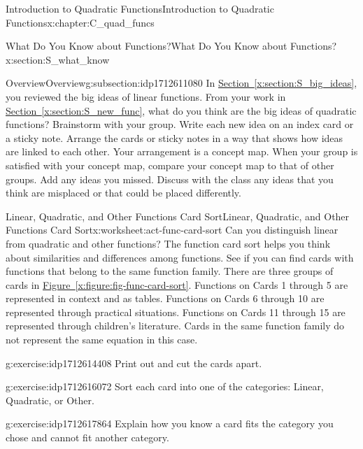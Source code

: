 \documentclass[oneside,10pt,]{book}
\newcommand{\xreffont}{\relax}
\numberwithin{equation}{chapter}
\begin{document}
\begin{chapterptx}{Introduction to Quadratic Functions}{}{Introduction to Quadratic Functions}{}{}{x:chapter:C_quad_funcs}
\begin{sectionptx}{What Do You Know about Functions?}{}{What Do You Know about Functions?}{}{}{x:section:S_what_know}
\begin{subsectionptx}{Overview}{}{Overview}{}{}{g:subsection:idp1712611080}
In \hyperref[x:section:S_big_ideas]{Section~{\xreffont\ref{x:section:S_big_ideas}}}, you reviewed the big ideas of linear functions. From your work in \hyperref[x:section:S_new_func]{Section~{\xreffont\ref{x:section:S_new_func}}\textendash{}{\xreffont\ref{x:section:S_func_fams}}}, what do you think are the big ideas of quadratic functions? Brainstorm with your group. Write each new idea on an index card or a sticky note. Arrange the cards or sticky notes in a way that shows how ideas are linked to each other. Your arrangement is a concept map. When your group is satisfied with your concept map, compare your concept map to that of other groups. Add any ideas you missed. Discuss with the class any ideas that you think are misplaced or that could be placed differently.%
\end{subsectionptx}
%
%
\typeout{************************************************}
\typeout{************************************************}
%
\begin{worksheet-subsection}{Linear, Quadratic, and Other Functions Card Sort}{}{Linear, Quadratic, and Other Functions Card Sort}{}{}{x:worksheet:act-func-card-sort}
Can you distinguish linear from quadratic and other functions? The function card sort helps you think about similarities and differences among functions. See if you can find cards with functions that belong to the same function family.%
There are three groups of cards in \hyperref[x:figure:fig-func-card-sort]{Figure~{\xreffont\ref{x:figure:fig-func-card-sort}}}. Functions on Cards 1 through 5 are represented in context and as tables. Functions on Cards 6 through 10 are represented through practical situations. Functions on Cards 11 through 15 are represented through children's literature. Cards in the same function family do not represent the same equation in this case.%
\begin{divisionexercise}{1}{}{}{g:exercise:idp1712614408}%
Print out and cut the cards apart.%
\end{divisionexercise}%
\begin{divisionexercise}{2}{}{}{g:exercise:idp1712616072}%
Sort each card into one of the categories: Linear, Quadratic, or Other.%
\end{divisionexercise}%
\begin{divisionexercise}{3}{}{}{g:exercise:idp1712617864}%
Explain how you know a card fits the category you chose and cannot fit another category.%

\end{divisionexercise}
\end{worksheet-subsection}
\end{sectionptx}
\end{chapterptx}
\end{document}
